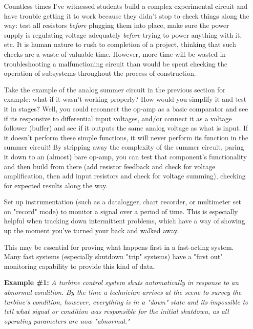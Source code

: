Countless times I've witnessed students build a complex experimental
circuit and have trouble getting it to work because they didn't stop to
check things along the way: test all resistors {\em before} plugging
them into place, make sure the power supply is regulating voltage
adequately {\em before} trying to power anything with it, etc. It is
human nature to rush to completion of a project, thinking that such
checks are a waste of valuable time. However, more time will be wasted
in troubleshooting a malfunctioning circuit than would be spent checking
the operation of subsystems throughout the process of construction.

Take the example of the analog summer circuit in the previous section
for example: what if it wasn't working properly? How would you simplify
it and test it in stages? Well, you could reconnect the op-amp as a
basic comparator and see if its responsive to differential input
voltages, and/or connect it as a voltage follower (buffer) and see if it
outputs the same analog voltage as what is input. If it doesn't perform
these simple functions, it will never perform its function in the summer
circuit! By stripping away the complexity of the summer circuit, paring
it down to an (almost) bare op-amp, you can test that component's
functionality and then build from there (add resistor feedback and check
for voltage amplification, then add input resistors and check for
voltage summing), checking for expected results along the way.

\stopsubsection

\startsubsection[title={Trap a Signal},reference={sec:xtocid157909712}]

Set up instrumentation (such as a datalogger, chart recorder, or
multimeter set on "record" mode) to monitor a signal over a period of
time. This is especially helpful when tracking down intermittent
problems, which have a way of showing up the moment you've turned your
back and walked away.

This may be essential for proving what happens first in a fast-acting
system. Many fast systems (especially shutdown "trip" systems) have a
"first out" monitoring capability to provide this kind of data.

{\bf Example \#1:} {\em A turbine control system shuts automatically in
response to an abnormal condition. By the time a technician arrives at
the scene to survey the turbine's condition, however, everything is in a
"down" state and its impossible to tell what signal or condition was
responsible for the initial shutdown, as all operating parameters are
now "abnormal."}

